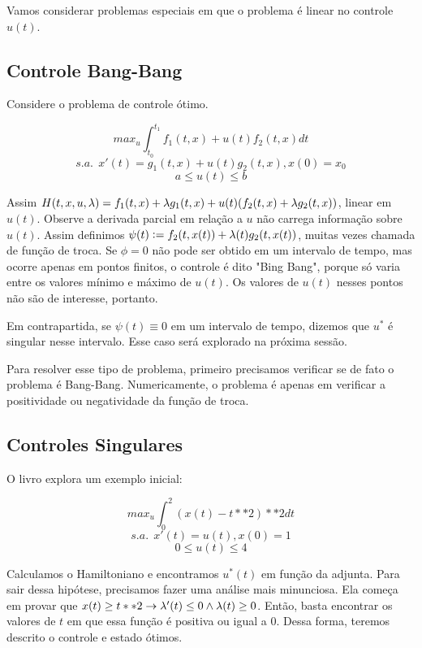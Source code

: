 Vamos considerar problemas especiais em que o problema é linear 
no controle $u(t)$. 

\subsection{Controle Bang-Bang}

Considere o problema de controle ótimo.

$$max_u \int_{t_0}^{t_1} f_1(t,x) + u(t)f_2(t,x) dt$$
$$s.a.~~x'(t) = g_1(t,x) + u(t)g_2(t,x), x(0) = x_0$$
$$ a \leq u(t) \leq b$$

Assim $H(t,x,u,\lambda) = f_1(t,x) + \lambda g_1(t,x) + u(t)(f_2(t,x) + \lambda g_2(t,x))$, 
linear em $u(t)$. Observe a derivada parcial em relação a $u$ não
carrega informação sobre $u(t)$. Assim definimos $\psi(t) := f_2(t,x(t)) + \lambda(t)g_2(t,x(t))$,
muitas vezes chamada de função de troca. Se $\phi = 0$ não pode ser obtido 
em um intervalo de tempo, mas ocorre apenas em pontos finitos, o controle
é dito "Bing Bang", porque só varia entre os valores mínimo e máximo de $u(t)$. 
Os valores de $u(t)$ nesses pontos não são de interesse, portanto. 

Em contrapartida, se $\psi(t) \equiv 0$ em um intervalo de tempo, dizemos que $u^*$ é 
singular nesse intervalo. Esse caso será explorado na próxima sessão. 

Para resolver esse tipo de problema, primeiro precisamos verificar se de fato 
o problema é Bang-Bang. Numericamente, o problema é apenas em verificar a positividade
ou negatividade da função de troca. 

\subsection{Controles Singulares}

O livro explora um exemplo inicial:

$$max_u \int_0^2 (x(t) - t**2)**2 dt $$
$$s.a. ~~ x'(t) = u(t), x(0) = 1$$
$$0 \leq u(t) \leq 4$$

Calculamos o Hamiltoniano e encontramos $u^*(t)$ em função da adjunta. 
Para sair dessa hipótese, precisamos fazer uma análise mais minunciosa. 
Ela começa em provar que $x(t) \geq t**2 \rightarrow \lambda'(t) \leq 0 \wedge \lambda(t) \geq 0$. 
Então, basta encontrar os valores de $t$ em que essa função é positiva 
ou igual a $0$. Dessa forma, teremos descrito o controle e estado ótimos.